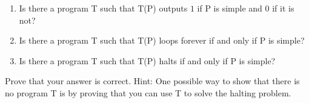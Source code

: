 \documentclass[11pt,fleqn]{article}
\begin{document}
\begin{enumerate}
\begin{enumerate}
\item Is there a program T such that T(P) outputs $1$ if P is simple and $0$ if it is not? 
\item Is there a program T such that T(P) loops forever if and only if P is simple? 
\item Is there a program T such that T(P) halts if and only if P is simple?
\end{enumerate}
Prove that your answer is correct.
Hint: One possible way to show that there is no program T is by proving that you can use T to solve the halting problem. 


\end{enumerate}
\end{document}
